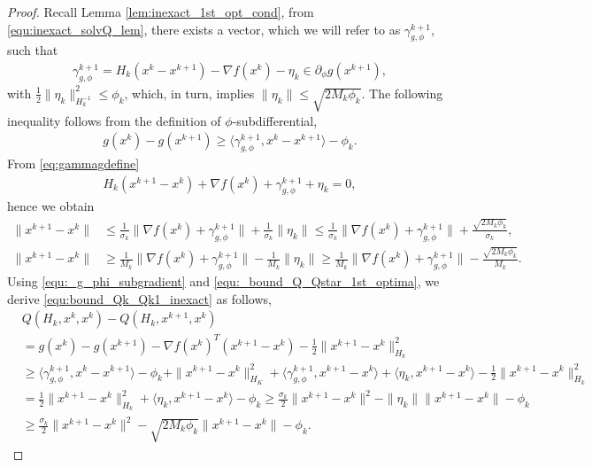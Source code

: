 \documentclass[11pt]{article}
\numberwithin{equation}{section}
\begin{document}
\begin{proof}
Recall Lemma \ref{lem:inexact_1st_opt_cond}, from \eqref{equ:inexact_solvQ_lem}, there
 exists a vector, which we will refer to as $\gamma_{g, \phi}^{k+1}$, such that
    \begin{align}       \label{eq:gammagdefine}
        \gamma_{g, \phi}^{k+1}=H_k(x^k-x^{k+1})- \nabla f(x^k)  - \eta_k \in \partial_{\phi}g(x^{k+1}),
    \end{align}
    with  $\frac{1}{2}\|\eta_k\|^2_{H_k^{-1}}\leq \phi_k$, which, in turn, implies $\|\eta_k\| \leq \sqrt{2M_k\phi_k}$.
  The following inequality follows from the definition of $\phi$-subdifferential,
	\begin{align}
        \label{equ:_g_phi_subgradient}
        g(x^k) - g(x^{k+1}) 
        \geq 
        \langle \gamma_{g, \phi}^{k+1}, x^k-x^{k+1} \rangle - \phi_k. 
    \end{align}
    From  \eqref{eq:gammagdefine}
    \begin{align}
        \label{equ:_bound_Q_Qstar_1st_optima}
        H_k(x^{k+1}-x^k) + \nabla f(x^k) + \gamma_{g, \phi}^{k+1}+\eta_k= 0, 
    \end{align}
     hence we obtain
    \begin{align*}
		\| x^{k+1} - x^k\|
		&\leq  \frac{1}{\sigma_k}\|  \nabla f(x^k) + \gamma_{g, \phi}^{k+1} \| + \frac{1}{\sigma_k}\|\eta_k\|
		\leq  
		\frac{1}{\sigma_k}\|  \nabla f(x^k) + \gamma_{g, \phi}^{k+1} \| + \frac{\sqrt{2M_k\phi_k}}{\sigma_k}, \\
		\| x^{k+1} - x^k\|
		&\geq   \frac{1}{M_k}\|  \nabla f(x^k) + \gamma_{g, \phi}^{k+1} \|-   \frac{1}{M_k}\|\eta_k\|
		\geq   
		\frac{1}{M_k}\|  \nabla f(x^k) + \gamma_{g, \phi}^{k+1} \|- \frac{\sqrt{2M_k\phi_k}}{M_k}.
	\end{align*}
	Using \eqref{equ:_g_phi_subgradient} and \eqref{equ:_bound_Q_Qstar_1st_optima}, we derive \eqref{equ:bound_Qk_Qk1_inexact} as follows,
	\begin{align*}
	        &Q(H_k,x^k,x^k) - Q(H_k,x^{k+1}, x^k) \\
	        &= g(x^k) - g(x^{k+1}) 
	        - \nabla f(x^k)^T( x^{k+1}-x^k)  
	        - \frac{1}{2}\|x^{k+1}-x^k\|^2_{H_k}  \\
	        &\geq \langle \gamma_{g, \phi}^{k+1}, x^{k}-x^{k+1} \rangle 
	        - \phi_k
	        + \|x^{k+1}-x^k\|_{H_K}^2 
	        +  \langle \gamma_{g, \phi}^{k+1}, x^{k+1} - x^{k}\rangle
	        + \langle \eta_k, x^{k+1}-x^k \rangle
	        - \frac{1}{2}\|x^{k+1}-x^k\|^2_{H_k} \\
			&= \frac{1}{2}\|x^{k+1}-x^k\|^2_{H_k} 
			+ \langle \eta_k,  x^{k+1}-x^k \rangle - \phi_k
			\geq \frac{\sigma_k}{2}\|x^{k+1}-x^k\|^2
			- \|\eta_k\|\|x^{k+1}-x^k\| - \phi_k  \\
	        &\geq \frac{\sigma_k}{2}\|x^{k+1}-x^k\|^2-\sqrt{2M_k\phi_k}\|x^{k+1}-x^k\| - \phi_k.
	\end{align*}
\end{proof}
\end{document}
